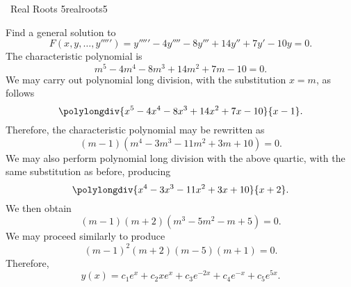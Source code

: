         \begin{example}{\Difficulty\,\Difficulty\,\,Real Roots 5}{realroots5}
        
            Find a general solution to
            \begin{equation*}
                F(x,y,\ldots,y''''')=y'''''-4y''''-8y'''+14y''+7y'-10y=0.
            \end{equation*}
            The characteristic polynomial is
            \begin{equation*}
                m^5-4m^4-8m^3+14m^2+7m-10=0.
            \end{equation*}
            We may carry out polynomial long division, with the substitution \(x=m\), as follows
            \begin{equation*}
                \polylongdiv{x^5-4x^4-8x^3+14x^2+7x-10}{x-1}.
            \end{equation*}
            Therefore, the characteristic polynomial may be rewritten as
            \begin{equation*}
                (m-1)(m^4-3m^3-11m^2+3m+10)=0.
            \end{equation*}
            We may also perform polynomial long division with the above quartic, with the same substitution as before, producing
            \begin{equation*}
                \polylongdiv{x^4-3x^3-11x^2+3x+10}{x+2}.
            \end{equation*}
            We then obtain
            \begin{equation*}
                (m-1)(m+2)(m^3-5m^2-m+5)=0.
            \end{equation*}
            We may proceed similarly to produce
            \begin{equation*}
                (m-1)^2(m+2)(m-5)(m+1)=0.
            \end{equation*}
            Therefore,
            \begin{equation*}
                y(x)=c_1e^x+c_2xe^x+c_3e^{-2x}+c_4e^{-x}+c_5e^{5x}.
            \end{equation*}
            
        \end{example}

